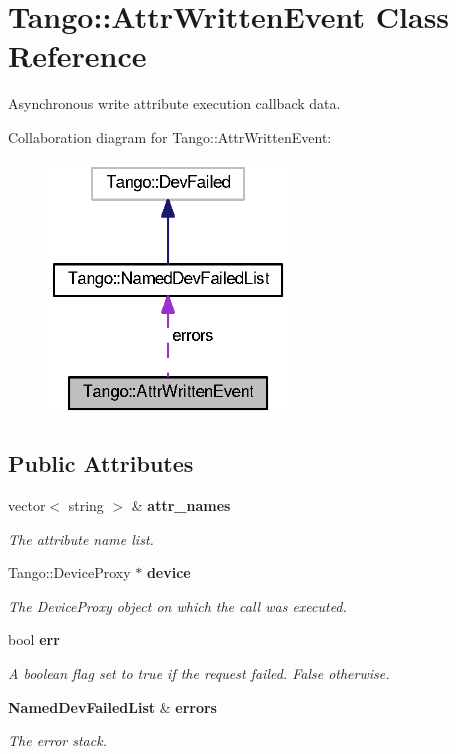 \section{Tango\-:\-:Attr\-Written\-Event Class Reference}
\label{classTango_1_1AttrWrittenEvent}


Asynchronous write attribute execution callback data.  




Collaboration diagram for Tango\-:\-:Attr\-Written\-Event\-:
\nopagebreak
\begin{figure}[H]
\begin{center}
\leavevmode
\includegraphics[width=180pt]{dc/d32/classTango_1_1AttrWrittenEvent__coll__graph}
\end{center}
\end{figure}
\subsection*{Public Attributes}
\begin{DoxyCompactItemize}
\item 
vector$<$ string $>$ \& {\bf attr\-\_\-names}
\begin{DoxyCompactList}\small\item\em The attribute name list. \end{DoxyCompactList}\item 
Tango\-::\-Device\-Proxy $\ast$ {\bf device}
\begin{DoxyCompactList}\small\item\em The Device\-Proxy object on which the call was executed. \end{DoxyCompactList}\item 
bool {\bf err}
\begin{DoxyCompactList}\small\item\em A boolean flag set to true if the request failed. False otherwise. \end{DoxyCompactList}\item 
{\bf Named\-Dev\-Failed\-List} \& {\bf errors}
\begin{DoxyCompactList}\small\item\em The error stack. \end{DoxyCompactList}\end{DoxyCompactItemize}


